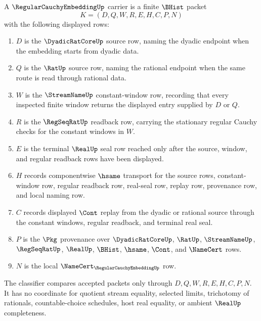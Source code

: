 \begin{definition}
\label{def:regular-cauchy-embedding-carrier}
A $\RegularCauchyEmbeddingUp$ carrier is a finite $\BHist$ packet
$$
K=(D,Q,W,R,E,H,C,P,N)
$$
with the following displayed rows:
\begin{enumerate}
\item $D$ is the $\DyadicRatCoreUp$ source row, naming the dyadic endpoint when the embedding starts from dyadic data.
\item $Q$ is the $\RatUp$ source row, naming the rational endpoint when the same route is read through rational data.
\item $W$ is the $\StreamNameUp$ constant-window row, recording that every inspected finite window returns the displayed entry supplied by $D$ or $Q$.
\item $R$ is the $\RegSeqRatUp$ readback row, carrying the stationary regular Cauchy checks for the constant windows in $W$.
\item $E$ is the terminal $\RealUp$ seal row reached only after the source, window, and regular readback rows have been displayed.
\item $H$ records componentwise $\hsame$ transport for the source rows, constant-window row, regular readback row, real-seal row, replay row, provenance row, and local naming row.
\item $C$ records displayed $\Cont$ replay from the dyadic or rational source through the constant windows, regular readback, and terminal real seal.
\item $P$ is the $\Pkg$ provenance over $\DyadicRatCoreUp$, $\RatUp$, $\StreamNameUp$, $\RegSeqRatUp$, $\RealUp$, $\BHist$, $\hsame$, $\Cont$, and $\NameCert$ rows.
\item $N$ is the local $\NameCert_{\RegularCauchyEmbeddingUp}$ row.
\end{enumerate}
The classifier compares accepted packets only through $D,Q,W,R,E,H,C,P,N$. It has no coordinate for quotient stream equality, selected limits, trichotomy of rationals, countable-choice schedules, host real equality, or ambient $\RealUp$ completeness.
\end{definition}

